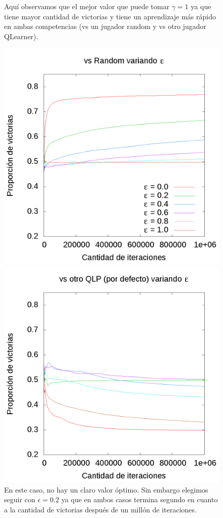 \documentclass[10pt, a4paper]{article}
\begin{document}
\begin{figure}[ht]
\begin{minipage}[c]{1\textwidth}
	Aquí observamos que el mejor valor que puede tomar $\gamma = 1$ ya que tiene mayor cantidad de victorias y tiene un aprendizaje más rápido en ambas competencias (vs un jugador random y vs otro jugador QLearner). 
  \end{minipage}
\end{figure}
\begin{figure}[ht]
  \begin{minipage}[c]{1\textwidth}
	\includegraphics[scale=0.25]{EpsilonR.png}
	\includegraphics[scale=0.25]{EpsilonQ.png}
	En este caso, no  hay un claro valor óptimo. Sin embargo elegimos seguir con $\epsilon=0.2$ ya que en ambos casos termina segundo en cuanto a la cantidad de victorias después de un millón de iteraciones.
  \end{minipage}
\end{figure}
\end{document}
